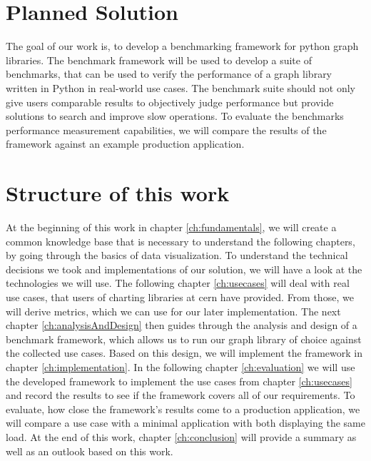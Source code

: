 
\section{Planned Solution}
\label{sec:Introduction:problem}

The goal of our work is, to develop a benchmarking framework for python graph
libraries.  The benchmark framework will be used to develop a suite of
benchmarks, that can be used to verify the performance of a graph library
written in Python in real-world use cases. The benchmark suite should not only
give users comparable results to objectively judge performance but provide
solutions to search and improve slow operations. To evaluate the benchmarks
performance measurement capabilities, we will compare the results of the
framework against an example production application.
  




\section{Structure of this work}
\label{sec:Introduction:problem}

At the beginning of this work in chapter \ref{ch:fundamentals}, we will create a
common knowledge base that is necessary to understand the following chapters, by
going through the basics of data visualization. To understand the technical
decisions we took and implementations of our solution, we will have a look at
the technologies we will use. The following chapter \ref{ch:usecases} will deal
with real use cases, that users of charting libraries at \gls{cern} have
provided. From those, we will derive metrics, which we can use for our later
implementation. The next chapter \ref{ch:analysisAndDesign} then guides through
the analysis and design of a benchmark framework, which allows us to run our
graph library of choice against the collected use cases.  Based on this design,
we will implement the framework in chapter \ref{ch:implementation}. In the
following chapter \ref{ch:evaluation} we will use the developed framework to
implement the use cases from chapter \ref{ch:usecases} and record the results to
see if the framework covers all of our requirements.  To evaluate, how close
the framework's results come to a production application, we will compare a use
case with a minimal application with both displaying the same load. At the end
of this work, chapter \ref{ch:conclusion} will provide a summary as well as an
outlook based on this work.
